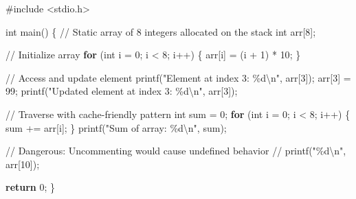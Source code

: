 \documentclass[
  letterpaper,
  DIV=11,
  numbers=noendperiod]{scrreprt}
\newenvironment{Shaded}{\begin{snugshade}}{\end{snugshade}}
\newcommand{\CommentTok}[1]{\textcolor[rgb]{0.37,0.37,0.37}{#1}}
\newcommand{\ControlFlowTok}[1]{\textcolor[rgb]{0.00,0.23,0.31}{\textbf{#1}}}
\newcommand{\DataTypeTok}[1]{\textcolor[rgb]{0.68,0.00,0.00}{#1}}
\newcommand{\DecValTok}[1]{\textcolor[rgb]{0.68,0.00,0.00}{#1}}
\newcommand{\ImportTok}[1]{\textcolor[rgb]{0.00,0.46,0.62}{#1}}
\newcommand{\NormalTok}[1]{\textcolor[rgb]{0.00,0.23,0.31}{#1}}
\newcommand{\OperatorTok}[1]{\textcolor[rgb]{0.37,0.37,0.37}{#1}}
\newcommand{\PreprocessorTok}[1]{\textcolor[rgb]{0.68,0.00,0.00}{#1}}
\newcommand{\SpecialCharTok}[1]{\textcolor[rgb]{0.37,0.37,0.37}{#1}}
\newcommand{\StringTok}[1]{\textcolor[rgb]{0.13,0.47,0.30}{#1}}
\begin{document}
\begin{Shaded}
\begin{Highlighting}[]
\PreprocessorTok{\#include }\ImportTok{\textless{}stdio.h\textgreater{}}

\DataTypeTok{int}\NormalTok{ main}\OperatorTok{()} \OperatorTok{\{}
    \CommentTok{// Static array of 8 integers allocated on the stack}
    \DataTypeTok{int}\NormalTok{ arr}\OperatorTok{[}\DecValTok{8}\OperatorTok{];}

    \CommentTok{// Initialize array}
    \ControlFlowTok{for} \OperatorTok{(}\DataTypeTok{int}\NormalTok{ i }\OperatorTok{=} \DecValTok{0}\OperatorTok{;}\NormalTok{ i }\OperatorTok{\textless{}} \DecValTok{8}\OperatorTok{;}\NormalTok{ i}\OperatorTok{++)} \OperatorTok{\{}
\NormalTok{        arr}\OperatorTok{[}\NormalTok{i}\OperatorTok{]} \OperatorTok{=} \OperatorTok{(}\NormalTok{i }\OperatorTok{+} \DecValTok{1}\OperatorTok{)} \OperatorTok{*} \DecValTok{10}\OperatorTok{;}
    \OperatorTok{\}}

    \CommentTok{// Access and update element}
\NormalTok{    printf}\OperatorTok{(}\StringTok{"Element at index 3: }\SpecialCharTok{\%d\textbackslash{}n}\StringTok{"}\OperatorTok{,}\NormalTok{ arr}\OperatorTok{[}\DecValTok{3}\OperatorTok{]);}
\NormalTok{    arr}\OperatorTok{[}\DecValTok{3}\OperatorTok{]} \OperatorTok{=} \DecValTok{99}\OperatorTok{;}
\NormalTok{    printf}\OperatorTok{(}\StringTok{"Updated element at index 3: }\SpecialCharTok{\%d\textbackslash{}n}\StringTok{"}\OperatorTok{,}\NormalTok{ arr}\OperatorTok{[}\DecValTok{3}\OperatorTok{]);}

    \CommentTok{// Traverse with cache{-}friendly pattern}
    \DataTypeTok{int}\NormalTok{ sum }\OperatorTok{=} \DecValTok{0}\OperatorTok{;}
    \ControlFlowTok{for} \OperatorTok{(}\DataTypeTok{int}\NormalTok{ i }\OperatorTok{=} \DecValTok{0}\OperatorTok{;}\NormalTok{ i }\OperatorTok{\textless{}} \DecValTok{8}\OperatorTok{;}\NormalTok{ i}\OperatorTok{++)} \OperatorTok{\{}
\NormalTok{        sum }\OperatorTok{+=}\NormalTok{ arr}\OperatorTok{[}\NormalTok{i}\OperatorTok{];}
    \OperatorTok{\}}
\NormalTok{    printf}\OperatorTok{(}\StringTok{"Sum of array: }\SpecialCharTok{\%d\textbackslash{}n}\StringTok{"}\OperatorTok{,}\NormalTok{ sum}\OperatorTok{);}

    \CommentTok{// Dangerous: Uncommenting would cause undefined behavior}
    \CommentTok{// printf("\%d\textbackslash{}n", arr[10]);}

    \ControlFlowTok{return} \DecValTok{0}\OperatorTok{;}
\OperatorTok{\}}
\end{Highlighting}
\end{Shaded}
\end{document}
